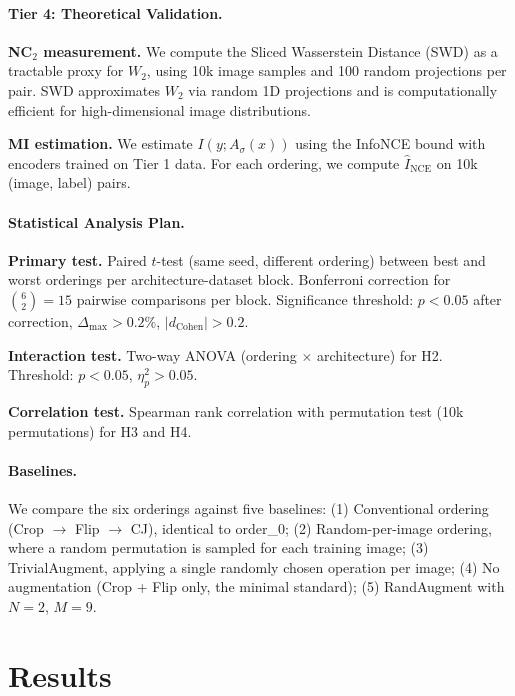 \documentclass{article}
\begin{document}
\paragraph{Tier 4: Theoretical Validation.}
\textbf{NC$_2$ measurement.} We compute the Sliced Wasserstein Distance (SWD) as a tractable proxy for $W_2$, using 10k image samples and 100 random projections per pair. SWD approximates $W_2$ via random 1D projections and is computationally efficient for high-dimensional image distributions.

\textbf{MI estimation.} We estimate $I(y; A_\sigma(x))$ using the InfoNCE bound with encoders trained on Tier 1 data. For each ordering, we compute $\hat{I}_{\mathrm{NCE}}$ on 10k (image, label) pairs.

\paragraph{Statistical Analysis Plan.}
\textbf{Primary test.} Paired $t$-test (same seed, different ordering) between best and worst orderings per architecture-dataset block. Bonferroni correction for $\binom{6}{2} = 15$ pairwise comparisons per block. Significance threshold: $p < 0.05$ after correction, $\Delta_{\max} > 0.2\%$, $|d_{\mathrm{Cohen}}| > 0.2$.

\textbf{Interaction test.} Two-way ANOVA (ordering $\times$ architecture) for H2. Threshold: $p < 0.05$, $\eta^2_p > 0.05$.

\textbf{Correlation test.} Spearman rank correlation with permutation test (10k permutations) for H3 and H4.

\paragraph{Baselines.}
We compare the six orderings against five baselines: (1) Conventional ordering (Crop $\to$ Flip $\to$ CJ), identical to order\_0; (2) Random-per-image ordering, where a random permutation is sampled for each training image; (3) TrivialAugment, applying a single randomly chosen operation per image; (4) No augmentation (Crop + Flip only, the minimal standard); (5) RandAugment with $N=2$, $M=9$.

\section{Results}
\end{document}
